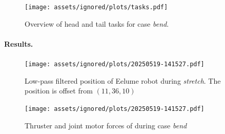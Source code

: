 \begin{figure}[!ht]
    \centering
    \texttt{[image: assets/ignored/plots/tasks.pdf]}
    \caption{Overview of head and tail tasks for case \textit{bend}.}
    \label{fig:eelume:tpc:tasks:bend}
\end{figure}

\paragraph{Results.}
\begin{figure}[!ht]
    \centering
    \texttt{[image: assets/ignored/plots/20250519-141527.pdf]}
    \caption[Low-pass filtered position of Eelume robot during \textit{stretch} case with \gls{tpc}]
    {Low-pass filtered position of Eelume robot during \textit{stretch}. The position is offset from \((11, 36, 10)\)}
    \label{fig:results:tpc:bend:1:pos}
\end{figure}
\begin{figure}[!ht]
    \centering
    \texttt{[image: assets/ignored/plots/20250519-141527.pdf]}
    \caption{Thruster and joint motor forces of during case \textit{bend}}
    \label{fig:results:tpc:bend:1:forces-torques}
\end{figure}
